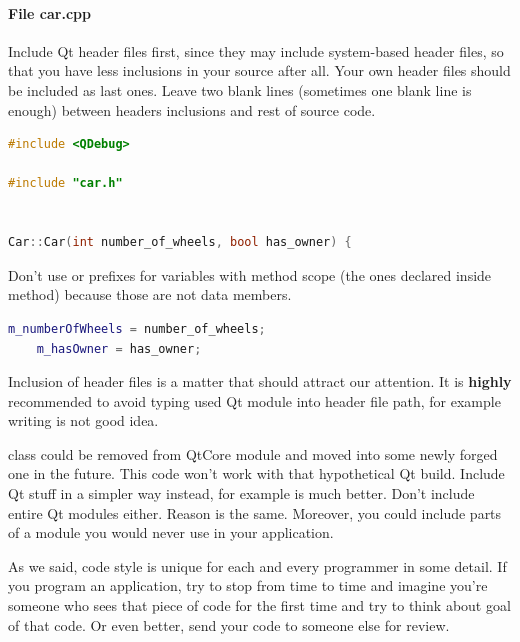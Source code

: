 \paragraph*{File car.cpp}
Include Qt header files first, since they may include system-based header files, so that you have less inclusions in your source after all. Your own header files should be included as last ones. Leave two blank lines (sometimes one blank line is enough) between headers inclusions and rest of source code.
\begin{lstlisting}[firstnumber=1,language=cpp]
#include <QDebug>

#include "car.h"


Car::Car(int number_of_wheels, bool has_owner) {
\end{lstlisting}
Don't use or prefixes for variables with method scope (the ones declared inside method) because those are not data members.
\begin{lstlisting}[firstnumber=6,language=cpp]
    m_numberOfWheels = number_of_wheels;
    m_hasOwner = has_owner;
\end{lstlisting}

\begin{fdocextra}
Inclusion of header files is a matter that should attract our attention. It is \textbf{highly} recommended to avoid typing used Qt module into header file path, for example writing is not good idea.

 class could be removed from QtCore module and moved into some newly forged one in the future.\footnotemark{} This code won't work with that hypothetical Qt build. Include Qt stuff in a simpler way instead, for example is much better. Don't include entire Qt modules either. Reason is the same. Moreover, you could include parts of a module you would never use in your application.
\end{fdocextra}

As we said, code style is unique for each and every programmer in some detail. If you program an application, try to stop from time to time and imagine you're someone who sees that piece of code for the first time and try to think about goal of that code. Or even better, send your code to someone else for review.